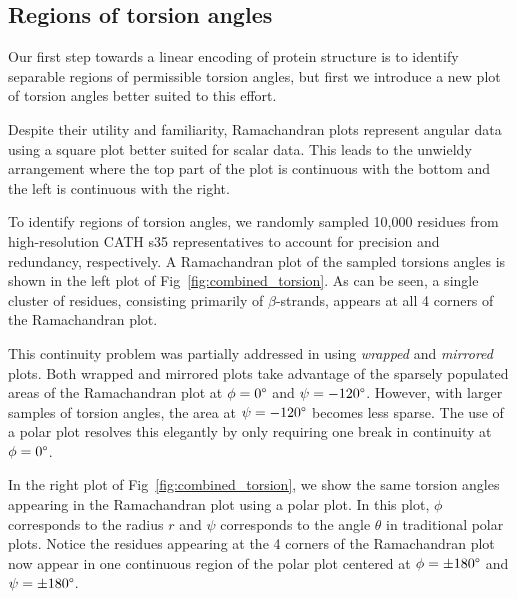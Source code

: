 \documentclass[10pt,letterpaper]{article}
\renewcommand{\figurename}{Fig}
\begin{document}
\subsection*{Regions of torsion angles}

Our first step towards a linear encoding of protein structure is to identify separable regions of permissible torsion angles,
but first we introduce a new plot of torsion angles better suited to this effort. 

Despite their utility and familiarity, Ramachandran plots \cite{Ramachandran1968} represent angular data using a square plot better suited for scalar data.
This leads to the unwieldy arrangement where the top part of the plot is continuous with the bottom and the left is continuous with the right. 

To identify regions of torsion angles, we randomly sampled 10,000 residues from high-resolution CATH s35 representatives to account for precision and redundancy, respectively. 
A Ramachandran plot of the sampled torsions angles is shown in the left plot of \figurename~\ref{fig:combined_torsion}. 
As can be seen, a single cluster of residues, consisting primarily of $\beta$-strands, appears at all 4 corners of the Ramachandran plot.

\begin{figure*}[!h]
\caption{Ramachandran plot (right) and polar plot (left) of randomly sampled torsion angles}
\label{fig:combined_torsion}
\end{figure*}

This continuity problem was partially addressed in \cite{Karplus2010} using \emph{wrapped} and \emph{mirrored} plots. 
Both wrapped and mirrored plots take advantage of the sparsely populated areas of the Ramachandran plot at $\phi = 0\degree$ and $\psi = -120\degree$.
However, with larger samples of torsion angles, the area at $\psi = -120\degree$ becomes less sparse. 
The use of a polar plot resolves this elegantly by only requiring one break in continuity at $\phi = 0\degree$. 

In the right plot of \figurename~\ref{fig:combined_torsion}, we show the same torsion angles appearing in the Ramachandran plot using a polar plot. 
In this plot, $\phi$ corresponds to the radius $r$ and $\psi$ corresponds to the angle $\theta$ in traditional polar plots. 
Notice the residues appearing at the 4 corners of the Ramachandran plot now appear in one continuous region of the polar plot centered at $\phi = \pm180\degree$ and $\psi = \pm180\degree$. 
\end{document}

